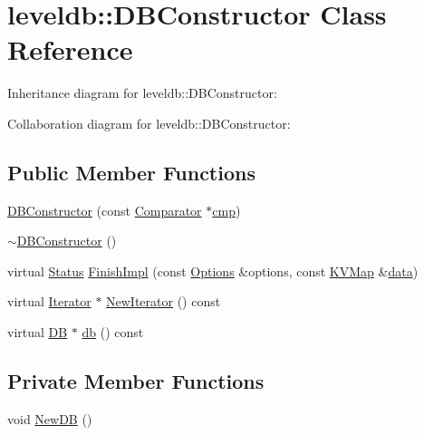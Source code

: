\hypertarget{classleveldb_1_1_d_b_constructor}{\section{leveldb\-:\-:D\-B\-Constructor Class Reference}
\label{classleveldb_1_1_d_b_constructor}
}


Inheritance diagram for leveldb\-:\-:D\-B\-Constructor\-:


Collaboration diagram for leveldb\-:\-:D\-B\-Constructor\-:
\subsection*{Public Member Functions}
\begin{DoxyCompactItemize}
\item 
\hyperlink{classleveldb_1_1_d_b_constructor_ae27ecdd7732629b08c25a63f82dfd4a9}{D\-B\-Constructor} (const \hyperlink{structleveldb_1_1_comparator}{Comparator} $\ast$\hyperlink{table__test_8cc_a87863e435922f0910ca8db43f02a6c0b}{cmp})
\item 
\hyperlink{classleveldb_1_1_d_b_constructor_a370a9584eadd852b375267f69fde241c}{$\sim$\-D\-B\-Constructor} ()
\item 
virtual \hyperlink{classleveldb_1_1_status}{Status} \hyperlink{classleveldb_1_1_d_b_constructor_a554d8e348d9135ff72a43a03c647c261}{Finish\-Impl} (const \hyperlink{structleveldb_1_1_options}{Options} \&options, const \hyperlink{namespaceleveldb_aac1e50450147be263e08252c6700f7a7}{K\-V\-Map} \&\hyperlink{classleveldb_1_1_constructor_a55a0363200d6e86d8beb3b15b75e3824}{data})
\item 
virtual \hyperlink{classleveldb_1_1_iterator}{Iterator} $\ast$ \hyperlink{classleveldb_1_1_d_b_constructor_a51936c1c2cb31fe26f5fb2a237cfdeec}{New\-Iterator} () const 
\item 
virtual \hyperlink{classleveldb_1_1_d_b}{D\-B} $\ast$ \hyperlink{classleveldb_1_1_d_b_constructor_a2bec14f01bb0fc459e0a09a70f06210d}{db} () const 
\end{DoxyCompactItemize}
\subsection*{Private Member Functions}
\begin{DoxyCompactItemize}
\item 
void \hyperlink{classleveldb_1_1_d_b_constructor_ac48bfe871db8558b57427843465e6c65}{New\-D\-B} ()
\end{DoxyCompactItemize}
